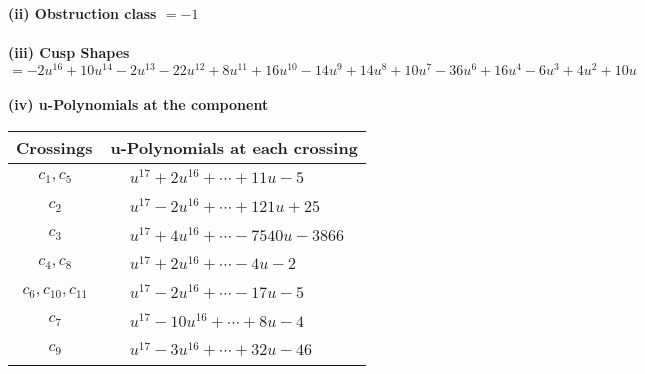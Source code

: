 \documentclass[1p]{elsarticle_modified}
\theoremstyle{definition}
\begin{document}
\flushleft \textbf{(ii) Obstruction class $= -1$}\\~\\
\flushleft \textbf{(iii) Cusp Shapes $= -2 u^{16}+10 u^{14}-2 u^{13}-22 u^{12}+8 u^{11}+16 u^{10}-14 u^9+14 u^8+10 u^7-36 u^6+16 u^4-6 u^3+4 u^2+10 u$}\\~\\
\newpage\renewcommand{\arraystretch}{1}
\flushleft \textbf{(iv) u-Polynomials at the component}\newline \\
\begin{tabular}{m{50pt}|m{274pt}}
Crossings & \hspace{64pt}u-Polynomials at each crossing \\
\hline $$\begin{aligned}c_{1},c_{5}\end{aligned}$$&$\begin{aligned}
&u^{17}+2 u^{16}+\cdots+11 u-5
\end{aligned}$\\
\hline $$\begin{aligned}c_{2}\end{aligned}$$&$\begin{aligned}
&u^{17}-2 u^{16}+\cdots+121 u+25
\end{aligned}$\\
\hline $$\begin{aligned}c_{3}\end{aligned}$$&$\begin{aligned}
&u^{17}+4 u^{16}+\cdots-7540 u-3866
\end{aligned}$\\
\hline $$\begin{aligned}c_{4},c_{8}\end{aligned}$$&$\begin{aligned}
&u^{17}+2 u^{16}+\cdots-4 u-2
\end{aligned}$\\
\hline $$\begin{aligned}c_{6},c_{10},c_{11}\end{aligned}$$&$\begin{aligned}
&u^{17}-2 u^{16}+\cdots-17 u-5
\end{aligned}$\\
\hline $$\begin{aligned}c_{7}\end{aligned}$$&$\begin{aligned}
&u^{17}-10 u^{16}+\cdots+8 u-4
\end{aligned}$\\
\hline $$\begin{aligned}c_{9}\end{aligned}$$&$\begin{aligned}
&u^{17}-3 u^{16}+\cdots+32 u-46
\end{aligned}$\\
\hline
\end{tabular}\\~\\
\end{document}
